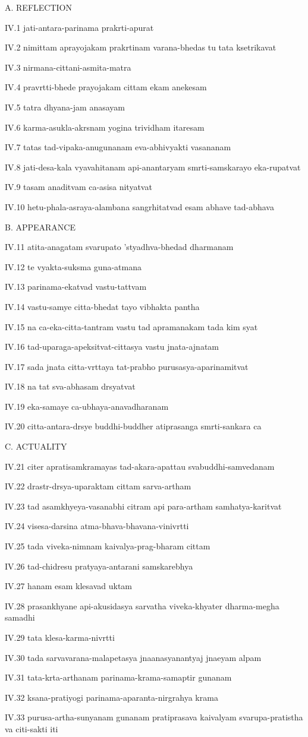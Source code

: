A. REFLECTION

IV.1
jati-antara-parinama prakrti-apurat

IV.2
nimittam aprayojakam prakrtinam varana-bhedas tu tata ksetrikavat

IV.3
nirmana-cittani-asmita-matra

IV.4
pravrtti-bhede prayojakam cittam ekam anekesam

IV.5
tatra dhyana-jam anasayam

IV.6
karma-asukla-akrsnam yogina trividham itaresam

IV.7
tatas tad-vipaka-anugunanam eva-abhivyakti vasananam

IV.8
jati-desa-kala vyavahitanam api-anantaryam smrti-samskarayo eka-rupatvat

IV.9
tasam anaditvam ca-asisa nityatvat

IV.10
hetu-phala-asraya-alambana sangrhitatvad esam abhave tad-abhava

B. APPEARANCE

IV.11
atita-anagatam svarupato 'styadhva-bhedad dharmanam

IV.12
te vyakta-suksma guna-atmana

IV.13
parinama-ekatvad vastu-tattvam

IV.14
vastu-samye citta-bhedat tayo vibhakta pantha

IV.15
na ca-eka-citta-tantram vastu tad apramanakam tada kim syat

IV.16
tad-uparaga-apeksitvat-cittasya vastu jnata-ajnatam

IV.17
sada jnata citta-vrttaya tat-prabho purusasya-aparinamitvat

IV.18
na tat sva-abhasam drsyatvat

IV.19
eka-samaye ca-ubhaya-anavadharanam

IV.20
citta-antara-drsye buddhi-buddher atiprasanga smrti-sankara ca

C. ACTUALITY

IV.21
citer apratisamkramayas tad-akara-apattau svabuddhi-samvedanam

IV.22
drastr-drsya-uparaktam cittam sarva-artham

IV.23
tad asamkhyeya-vasanabhi citram api para-artham samhatya-karitvat

IV.24
visesa-darsina atma-bhava-bhavana-vinivrtti

IV.25
tada viveka-nimnam kaivalya-prag-bharam cittam

IV.26
tad-chidresu pratyaya-antarani samskarebhya

IV.27
hanam esam klesavad uktam

IV.28
prasankhyane api-akusidasya sarvatha viveka-khyater dharma-megha samadhi

IV.29
tata klesa-karma-nivrtti

IV.30
tada sarvavarana-malapetasya jnaanasyanantyaj jnaeyam alpam

IV.31
tata-krta-arthanam parinama-krama-samaptir gunanam

IV.32
ksana-pratiyogi parinama-aparanta-nirgrahya krama

IV.33
purusa-artha-sunyanam gunanam pratiprasava kaivalyam
svarupa-pratistha va citi-sakti iti
